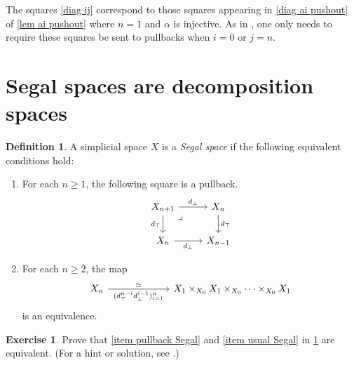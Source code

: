 \documentclass{amsart}
\theoremstyle{definition}
\newtheorem{definition}[theorem]{Definition}
\newtheorem{exercise}[theorem]{Exercise}
\theoremstyle{remark}
\newcommand{\op}{\textup{op}}
\begin{document}
The squares \eqref{diag ij} correspond to those squares appearing in \eqref{diag ai pushout} of \cref{lem ai pushout} where $n=1$ and $\alpha$ is injective.
As in \cite[Proposition 2.3.2]{DyckerhoffKapranov:HSS}, one only needs to require these squares be sent to pullbacks when $i=0$ or $j=n$.

\section{Segal spaces are decomposition spaces}\label{sec segal spaces}


\begin{definition}\label{def Segal}
A simplicial space $X$ is a \emph{Segal space} if the following equivalent conditions hold:
\begin{enumerate}
\item \label{item pullback Segal} For each $n\geq 1$, the following square is a pullback. 
\[ \begin{tikzcd}
X_{n+1} \ar[dr, phantom, "\lrcorner" very near start] \rar{d_\bot} \dar[swap]{d_\top} & X_n \dar{d_\top} \\
X_n \rar[swap]{d_\bot} & X_{n-1}
\end{tikzcd} \]
\item For each $n\geq 2$, the map
\[
\begin{tikzcd}[column sep=2.2cm]
X_n \rar["(d_\top^{n-i} d_\bot^{i-1})_{i=1}^n" swap, "\simeq"] & X_1 \times_{X_0} X_1 \times_{X_0} \dots  \times_{X_0} X_1
\end{tikzcd} 
\]
is an equivalence. \label{item usual Segal}
\end{enumerate}
\end{definition}

\begin{exercise}
Prove that \eqref{item pullback Segal} and \eqref{item usual Segal} in \cref{def Segal} are equivalent. (For a hint or solution, see \cite[Lemma 2.10]{GKT1}.)
\end{exercise}

\end{document}
